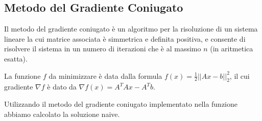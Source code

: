 {\color{oorange}\subsection{Metodo del Gradiente Coniugato}}
Il metodo del gradiente coniugato è un algoritmo per la risoluzione di un sistema lineare la cui matrice associata  
è simmetrica e definita positiva,
 e consente di risolvere il sistema in un numero di iterazioni che è al massimo $n$ (in aritmetica esatta).

La funzione $f$ da minimizzare è data dalla formula
  $f(x) = \frac{1}{2} ||Ax - b||_2^2 $, il cui gradiente $\nabla f$ è dato da
$\nabla f(x) = A^TAx - A^Tb  $.

Utilizzando il metodo del gradiente coniugato implementato nella funzione 
 abbiamo calcolato la soluzione naive.


